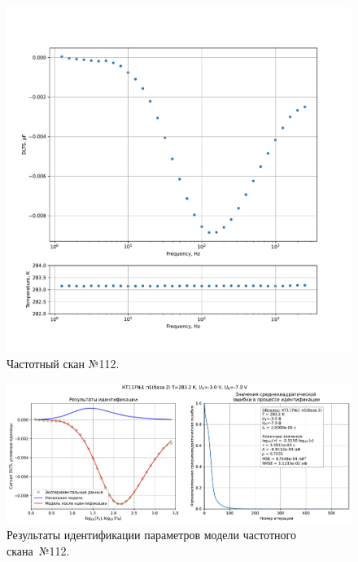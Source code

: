 \begin{figure}[!ht]
    \centering
    \includegraphics[width=1\textwidth]{../plots/КТ117№1_п1(база 2)_2500Гц-1Гц_1пФ_+10С_-3В-7В_200мВ_20мкс_шаг_0,1.pdf}
    \caption{Частотный скан №112.}
    \label{pic:frequency_scan_112}
\end{figure}

\begin{figure}[!ht]
    \centering
    \includegraphics[width=1\textwidth]{../plots/КТ117№1_п1(база 2)_2500Гц-1Гц_1пФ_+10С_-3В-7В_200мВ_20мкс_шаг_0,1_model.pdf}
    \caption{Результаты идентификации параметров модели частотного скана~№112.}
    \label{pic:frequency_scan_model112}
\end{figure}

\pagebreak



